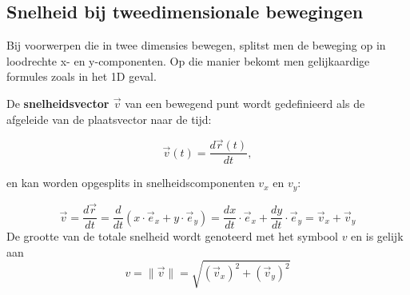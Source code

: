 \documentclass{ximera}
\begin{document}
\subsection*{Snelheid bij tweedimensionale bewegingen}

Bij voorwerpen die in twee dimensies bewegen, splitst men de beweging op in loodrechte x- en y-componenten. 
Op die manier bekomt men gelijkaardige formules zoals in het 1D geval.





\begin{definition}
	
De \textbf{snelheidsvector \(\vec{v}\)} van een bewegend punt wordt gedefinieerd als de afgeleide van de plaatsvector naar de tijd:

\[
\vec{v}(t) = \frac{d\vec{r}(t)}{dt},
\]

en kan worden opgesplits in snelheidscomponenten \(v_x\) en \(v_y\):

\[
	\vec{v} = \frac{d\vec{r}}{dt} = \frac{d}{dt}(x \cdot \vec{e}_x + y \cdot \vec{e}_y) = \frac{dx}{dt} \cdot \vec{e}_x + \frac{dy}{dt} \cdot \vec{e}_y = \vec{v}_x + \vec{v}_y
\]
De grootte van de totale snelheid wordt genoteerd met het symbool \(v\) en is gelijk aan 
\[
v = \| \vec{v}\| = \sqrt{(\vec{v}_x)^2 + (\vec{v}_y)^2}
\]

\begin{image}[0.5\textwidth]
\end{image}
\end{definition}
\end{document}
